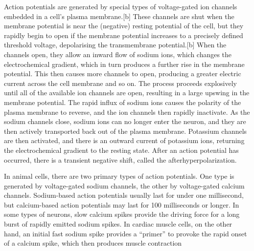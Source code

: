 \documentclass[]{book}
\begin{document}
Action potentials are generated by special types of voltage-gated ion channels embedded in a cell's plasma membrane.{[}b{]} These channels are shut when the membrane potential is near the (negative) resting potential of the cell, but they rapidly begin to open if the membrane potential increases to a precisely defined threshold voltage, depolarising the transmembrane potential.{[}b{]} When the channels open, they allow an inward flow of sodium ions, which changes the electrochemical gradient, which in turn produces a further rise in the membrane potential. This then causes more channels to open, producing a greater electric current across the cell membrane and so on. The process proceeds explosively until all of the available ion channels are open, resulting in a large upswing in the membrane potential. The rapid influx of sodium ions causes the polarity of the plasma membrane to reverse, and the ion channels then rapidly inactivate. As the sodium channels close, sodium ions can no longer enter the neuron, and they are then actively transported back out of the plasma membrane. Potassium channels are then activated, and there is an outward current of potassium ions, returning the electrochemical gradient to the resting state. After an action potential has occurred, there is a transient negative shift, called the afterhyperpolarization.

In animal cells, there are two primary types of action potentials. One type is generated by voltage-gated sodium channels, the other by voltage-gated calcium channels. Sodium-based action potentials usually last for under one millisecond, but calcium-based action potentials may last for 100 milliseconds or longer. In some types of neurons, slow calcium spikes provide the driving force for a long burst of rapidly emitted sodium spikes. In cardiac muscle cells, on the other hand, an initial fast sodium spike provides a ``primer'' to provoke the rapid onset of a calcium spike, which then produces muscle contraction
\end{document}
